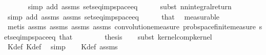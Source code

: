 \begin{isabellebody}
\ \ \ \ \ \isamarkupfalse%
\ {\isacharparenleft}{\kern0pt}simp\ add{\isacharcolon}{\kern0pt}\ assms{\isacharparenleft}{\kern0pt}{}{\isacharparenright}{\kern0pt}\ sets{\isacharunderscore}{\kern0pt}eq{\isacharunderscore}{\kern0pt}imp{\isacharunderscore}{\kern0pt}space{\isacharunderscore}{\kern0pt}eq{\isacharparenright}{\kern0pt}\isanewline
\ \ \ \ \isamarkupfalse%
\ {\isacharparenleft}{\kern0pt}subst\ nn{\isacharunderscore}{\kern0pt}integral{\isacharunderscore}{\kern0pt}return{\isacharparenright}{\kern0pt}\isanewline
\ \ \ \ \ \ \isamarkupfalse%
\ {\isacharparenleft}{\kern0pt}simp\ add{\isacharcolon}{\kern0pt}\ assms{\isacharparenleft}{\kern0pt}{}{\isacharparenright}{\kern0pt}\ assms{\isacharparenleft}{\kern0pt}{}{\isacharparenright}{\kern0pt}\ sets{\isacharunderscore}{\kern0pt}eq{\isacharunderscore}{\kern0pt}imp{\isacharunderscore}{\kern0pt}space{\isacharunderscore}{\kern0pt}eq{\isacharparenright}{\kern0pt}\isanewline
\ \ \ \ \isamarkupfalse%
\ that\ \isamarkupfalse%
\ measurable\isanewline
\ \ \ \ \isamarkupfalse%
\ {\isacharparenleft}{\kern0pt}metis\ assms{\isacharparenleft}{\kern0pt}{}{\isacharparenright}{\kern0pt}\ assms{\isacharparenleft}{\kern0pt}{}{\isacharparenright}{\kern0pt}\ assms{\isacharparenleft}{\kern0pt}{}{\isacharparenright}{\kern0pt}\ assms{\isacharparenleft}{\kern0pt}{}{\isacharparenright}{\kern0pt}\ convolution{\isacharunderscore}{\kern0pt}emeasure\ prob{\isacharunderscore}{\kern0pt}space{\isachardot}{\kern0pt}finite{\isacharunderscore}{\kern0pt}measure\ sets{\isacharunderscore}{\kern0pt}eq{\isacharunderscore}{\kern0pt}imp{\isacharunderscore}{\kern0pt}space{\isacharunderscore}{\kern0pt}eq\ that{\isacharparenright}{\kern0pt}\isanewline
\ \ \ \ \isamarkupfalse%
\isanewline
\ \ \isamarkupfalse%
\ {\isacharquery}{\kern0pt}thesis\isanewline
\ \ \isamarkupfalse%
\ {\isacharparenleft}{\kern0pt}subst\ kernel{\isacharunderscore}{\kern0pt}comp{\isacharunderscore}{\kern0pt}kernel{\isacharparenright}{\kern0pt}\isanewline
\ \ \isamarkupfalse%
\ Kdef\ Kdef\ \isamarkupfalse%
\ simp\isanewline
\ \ \isamarkupfalse%
\ Kdef\ assms{\isacharparenleft}{\kern0pt}{}{\isacharparenright}{\kern0pt}\isanewline

\end{isabellebody}
